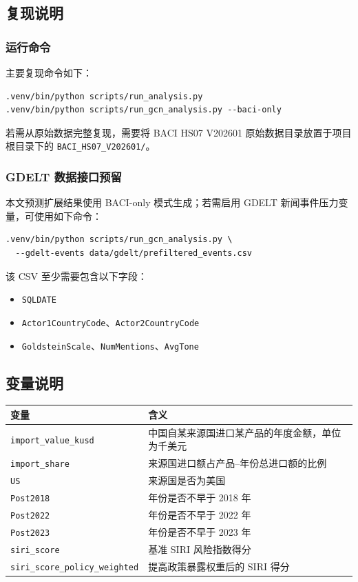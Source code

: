 \subsection{复现说明}

\subsubsection{运行命令}

主要复现命令如下：
\begin{verbatim}
.venv/bin/python scripts/run_analysis.py
.venv/bin/python scripts/run_gcn_analysis.py --baci-only
\end{verbatim}
若需从原始数据完整复现，需要将 BACI HS07 V202601 原始数据目录放置于项目根目录下的 \texttt{BACI\_HS07\_V202601/}。

\subsubsection{GDELT 数据接口预留}

本文预测扩展结果使用 BACI-only 模式生成；若需启用 GDELT 新闻事件压力变量，可使用如下命令：
\begin{verbatim}
.venv/bin/python scripts/run_gcn_analysis.py \
  --gdelt-events data/gdelt/prefiltered_events.csv
\end{verbatim}
该 CSV 至少需要包含以下字段：
\begin{itemize}
  \item \texttt{SQLDATE}
  \item \texttt{Actor1CountryCode}、\texttt{Actor2CountryCode}
  \item \texttt{GoldsteinScale}、\texttt{NumMentions}、\texttt{AvgTone}
\end{itemize}

\subsection{变量说明}

\begin{longtable}{@{}>{\raggedright\arraybackslash}p{}>{\raggedright\arraybackslash}p{}@{}}
\toprule
变量 & 含义 \\
\midrule
\endhead
\texttt{import\_value\_kusd} & 中国自某来源国进口某产品的年度金额，单位为千美元 \\
\texttt{import\_share} & 来源国进口额占产品--年份总进口额的比例 \\
\texttt{US} & 来源国是否为美国 \\
\texttt{Post2018} & 年份是否不早于 2018 年 \\
\texttt{Post2022} & 年份是否不早于 2022 年 \\
\texttt{Post2023} & 年份是否不早于 2023 年 \\
\texttt{siri\_score} & 基准 SIRI 风险指数得分 \\
\texttt{siri\_score\_policy\_weighted} & 提高政策暴露权重后的 SIRI 得分 \\
\bottomrule
\end{longtable}

